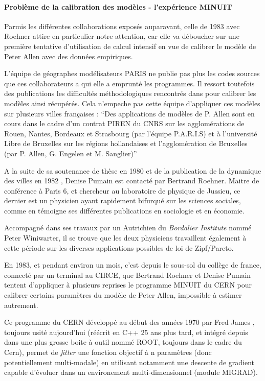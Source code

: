\paragraph{Problème de la calibration des modèles - l'expérience MINUIT}
\label{p:experience_minuit}

Parmis les différentes collaborations exposés auparavant, celle de 1983 avec Roehner attire en particulier notre attention, car elle va déboucher sur une première tentative d’utilisation de calcul intensif en vue de calibrer le modèle de Peter Allen avec des données empiriques.

L'équipe de géographes modélisateurs PARIS ne publie pas plus les codes sources que ces collaborateurs a qui elle a emprunté les programmes. Il ressort toutefois des publications les difficultés méthodologiques rencontrés dans pour calibrer les modèles ainsi récupérés.  Cela n'empeche pas cette équipe d'appliquer ces modèles sur plusieurs villes françaises \autocite[134]{Pumain1984} : \enquote{Des applications de modèles de P. Allen sont en cours dans le cadre d'un contrat PIREN du CNRS sur les agglomérations de Rouen, Nantes, Bordeaux et Strasbourg (par l'équipe P.A.R.I.S) et à l'université Libre de Bruxelles sur les régions hollandaises et l'agglomération de Bruxelles (par P. Allen, G. Engelen et M. Sanglier)}

A la suite de sa soutenance de thèse en 1980 et de la publication de la dynamique des villes en 1982 \autocite{Pumain1982}, Denise Pumain est contacté par Bertrand Roehner. Maitre de conférence à Paris 6, et chercheur au laboratoire de physique de Jussieu, ce dernier est un physicien ayant rapidement bifurqué sur les sciences sociales, comme en témoigne ses différentes publications en sociologie et en économie.

Accompagné dans ses travaux par un Autrichien du \textit{Bordalier Institute} nommé Peter Winiwarter, il se trouve que les deux physiciens travaillent également à cette période sur les diverses applications possibles de loi de Zipf/Pareto.

En 1983, et pendant environ un mois, c’est depuis le sous-sol du collège de france, connecté par un terminal au CIRCE, que Bertrand Roehner et Denise Pumain tentent d’appliquer à plusieurs reprises le programme MINUIT du CERN pour calibrer certains paramètres du modèle de Peter Allen, impossible à estimer autrement.

Ce programme du CERN développé au début des années 1970 par Fred James \autocite{James1972}, toujours usité aujourd’hui (réécrit en C++ 25 ans plus tard, et intégré depuis dans une plus grosse boite à outil nommé ROOT, toujours dans le cadre du Cern), permet de \textit{fitter} une fonction objectif à n paramètres (donc potentiellement multi-modale) en utilisant notamment une descente de gradient capable d’évoluer  dans un environement multi-dimensionnel (module MIGRAD).

